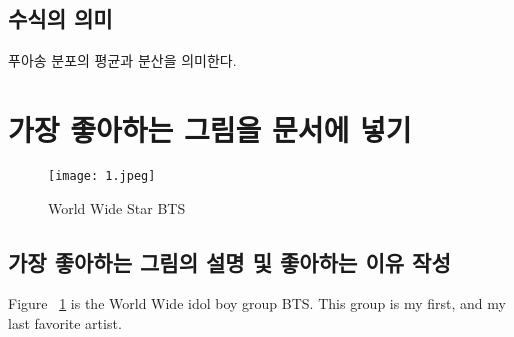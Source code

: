 \documentclass{article}
\begin{document}
\subsection{수식의 의미}
푸아송 분포의 평균과 분산을 의미한다.
\section{가장 좋아하는 그림을 문서에 넣기}
\begin{figure} [h]
\centering 
\texttt{[image: 1.jpeg]} 
\caption{World Wide Star BTS} 
\label{fig1}
\end{figure} 

\subsection{가장 좋아하는 그림의 설명 및 좋아하는 이유 작성}
Figure ~\ref{fig1} is the World Wide idol boy group BTS. This group is my first, and my last favorite artist. 
\end{document}
